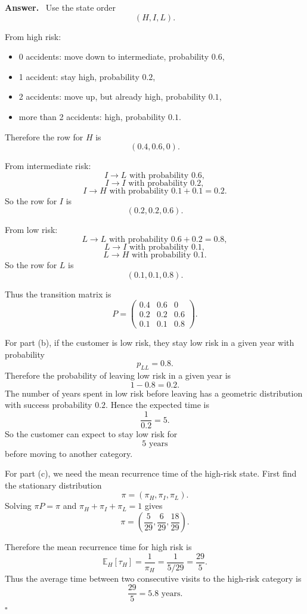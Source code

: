 \documentclass[12pt,a4paper]{article}
\theoremstyle{lecturestyle}
\newenvironment{answer}
{\par\textbf{Answer.}\ }
{\hfill$\square$\par}
\newcommand{\E}{\mathbb{E}}
\begin{document}
\begin{answer}
Use the state order
\[
(H,I,L).
\]

From high risk:
\begin{itemize}[leftmargin=1.2cm]
    \item 0 accidents: move down to intermediate, probability $0.6$,
    \item 1 accident: stay high, probability $0.2$,
    \item 2 accidents: move up, but already high, probability $0.1$,
    \item more than 2 accidents: high, probability $0.1$.
\end{itemize}
Therefore the row for $H$ is
\[
(0.4,0.6,0).
\]

From intermediate risk:
\[
I\to L \text{ with probability }0.6,
\]
\[
I\to I \text{ with probability }0.2,
\]
\[
I\to H \text{ with probability }0.1+0.1=0.2.
\]
So the row for $I$ is
\[
(0.2,0.2,0.6).
\]

From low risk:
\[
L\to L \text{ with probability }0.6+0.2=0.8,
\]
\[
L\to I \text{ with probability }0.1,
\]
\[
L\to H \text{ with probability }0.1.
\]
So the row for $L$ is
\[
(0.1,0.1,0.8).
\]

Thus the transition matrix is
\[
P=
\begin{pmatrix}
0.4 & 0.6 & 0\\
0.2 & 0.2 & 0.6\\
0.1 & 0.1 & 0.8
\end{pmatrix}.
\]

For part (b), if the customer is low risk, they stay low risk in a given year with probability
\[
p_{LL}=0.8.
\]
Therefore the probability of leaving low risk in a given year is
\[
1-0.8=0.2.
\]
The number of years spent in low risk before leaving has a geometric distribution with success probability $0.2$. Hence the expected time is
\[
\frac1{0.2}=5.
\]
So the customer can expect to stay low risk for
\[
\boxed{5\text{ years}}
\]
before moving to another category.

For part (c), we need the mean recurrence time of the high-risk state. First find the stationary distribution
\[
\pi=(\pi_H,\pi_I,\pi_L).
\]
Solving $\pi P=\pi$ and $\pi_H+\pi_I+\pi_L=1$ gives
\[
\pi=\left(\frac5{29},\frac6{29},\frac{18}{29}\right).
\]

Therefore the mean recurrence time for high risk is
\[
\E_H[\tau_H]=\frac1{\pi_H}
=
\frac1{5/29}
=
\frac{29}{5}.
\]
Thus the average time between two consecutive visits to the high-risk category is
\[
\boxed{\frac{29}{5}=5.8\text{ years}.}
\]
\end{answer}
\end{document}
